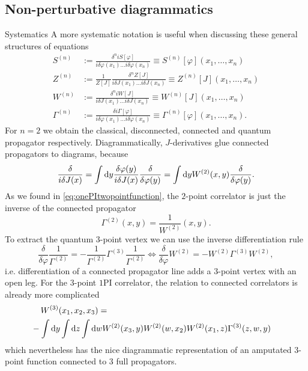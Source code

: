  \subsection{Non-perturbative diagrammatics}
 \begin{mybox}{Systematics}
 	A more systematic notation is useful when discussing these general structures of equations
 	\begin{align}
 	S^{(n)} &:= \frac{\delta^n i S[\varphi]}{i \delta \varphi(x_1) \dots i\delta \varphi(x_n)} \equiv S^{(n)}[\varphi](x_1,\dots,x_n) \label{eq:onePIClassicalPropagator}\\
 	Z^{(n)} &:= \frac{1}{Z[J]} \frac{\delta^n Z[J]}{i\delta J(x_1) \dots i\delta J(x_n)} \equiv Z^{(n)}[J](x_1,\dots,x_n) \label{eq:onePIDisconnectedPropagator}\\
 	W^{(n)} &:= \frac{\delta^n i W[J]}{i\delta J(x_1) \dots i\delta J(x_n)} \equiv W^{(n)}[J] (x_1,\dots,x_n) \label{eq:onePIConnectedPropagator}\\
 	\Gamma^{(n)} &:= \frac{\delta i \Gamma[\varphi]}{i\delta \varphi(x_1)\dots i\delta \varphi(x_n)} \equiv \Gamma^{(n)}[\varphi](x_1,\dots,x_n).\label{eq:onePIQuantumPropagator}
 	\end{align}
 	For $n=2$ we obtain the classical, disconnected, connected and quantum propagator respectively. Diagrammatically, $J$-derivatives glue connected propagators to diagrams, because
 	\begin{equation}
 	\label{eq:onePISourceDiagrammatic}
 		\frac{\delta}{i\delta J(x)} = \int \mathrm{d} y \frac{\delta \varphi(y)}{i \delta J(x)} \frac{\delta}{\delta \varphi(y)} = \int \mathrm{d} y W^{(2)}(x,y) \frac{\delta}{\delta \varphi(y)}.
 	\end{equation}
 	As we found in \ref{eq:onePItwopointfunction}, the $2$-point correlator is just the inverse of the connected propagator
 	\begin{equation}
 	\label{eq:onePItwopointfunctionDiagrammatic}
 	\Gamma^{(2)}(x,y)=\frac{1}{W^{(2)}} (x,y).
 	\end{equation}
 	To extract the quantum $3$-point vertex we can use the inverse differentiation rule
 	\begin{equation}
 	\label{eq:onePIthreeVertex}
 		\frac{\delta}{\delta \varphi} \frac{1}{\Gamma^{(2)}} = - \frac{1}{\Gamma^{(2)}} \Gamma^{(3)} \frac{1}{\Gamma^{(2)}} \Leftrightarrow\frac{\delta}{\delta \varphi} W^{(2)} = - W^{(2)} \Gamma^{(3)} W^{(2)},
 	\end{equation}
 	i.e. differentiation of a connected propagator line adds a $3$-point vertex with an open leg. For the $3$-point $1$PI correlator, the relation to connected correlators is already more complicated
 	\begin{align}
 	\label{eq:onePIthreepointfunctionDiagrammatic}
 		&W^{(3)}(x_1,x_2,x_3) =\\
 		&\hspace{-0.4cm}-\int \md y\int \md z\int \md w W^{(2)}(x_3,y) W^{(2)}(w,x_2)W^{(2)}(x_1,z) \Gamma^{(3)}(z,w,y) \nonumber
 	\end{align}
 	which nevertheless has the nice diagrammatic representation of an amputated $3$-point function connected to $3$ full propagators.
 \end{mybox}
